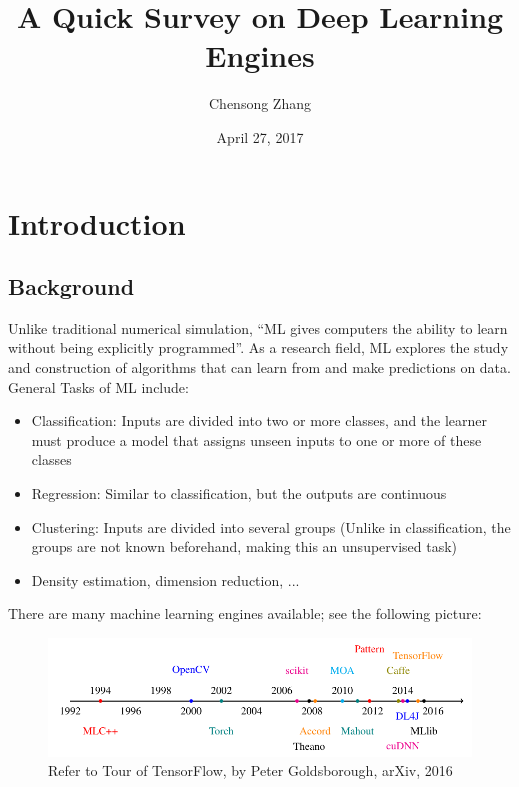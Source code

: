 \documentclass[11pt, oneside]{article}   	%
\title{A Quick Survey on Deep Learning Engines}
\author{Chensong Zhang}
\date{April 27, 2017}
\begin{document}

\maketitle


\section{Introduction}\label{sec:intro}


\subsection{Background}

Unlike traditional numerical simulation, ``ML gives computers the ability to learn without being explicitly programmed''. As a research field, ML explores the study and construction of algorithms that can {learn} from and {make predictions} on {data}. General Tasks of ML include:

\begin{itemize}

\item Classification: Inputs are divided into two or more classes, and the learner must produce a model that assigns unseen inputs to one or more of these classes

\item Regression: Similar to classification, but the outputs are continuous

\item Clustering: Inputs are divided into several groups (Unlike in classification, the groups are not known beforehand, making this an unsupervised task)

\item Density estimation, dimension reduction, ...

\end{itemize}

There are many machine learning engines available; see the following picture:
\begin{figure}[htbp] %
   \centering
   \includegraphics[width=\linewidth]{figures/ML.pdf}
   \caption{Refer to Tour of TensorFlow, by Peter Goldsborough, arXiv, 2016}
\end{figure}
\end{document}
